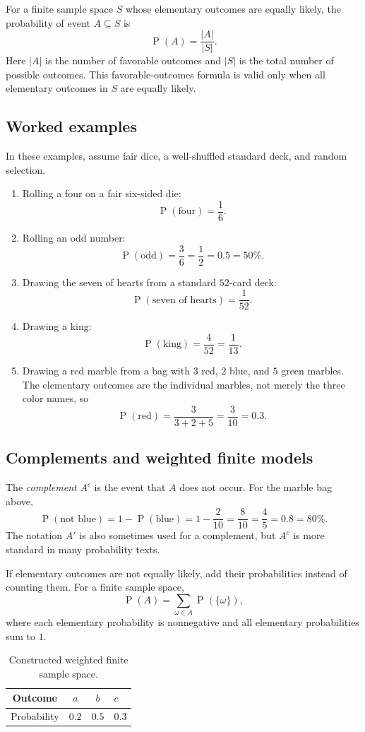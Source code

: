 \documentclass[11pt]{article}
\newcommand{\Pp}{\operatorname{P}}
\begin{document}
For a finite sample space $S$ whose elementary outcomes are equally likely, the
probability of event $A\subseteq S$ is
\[
\Pp(A)=\frac{|A|}{|S|}.
\]
Here $|A|$ is the number of favorable outcomes and $|S|$ is the total number of
possible outcomes.  This favorable-outcomes formula is valid only when all
elementary outcomes in $S$ are equally likely.

\subsection{Worked examples}
In these examples, assume fair dice, a well-shuffled standard deck, and random
selection.
\begin{enumerate}[label=\textbf{\arabic*.}]
\item Rolling a four on a fair six-sided die:
\[
\Pp(\text{four})=\frac{1}{6}.
\]
\item Rolling an odd number:
\[
\Pp(\text{odd})=\frac{3}{6}=\frac{1}{2}=0.5=50\%.
\]
\item Drawing the seven of hearts from a standard $52$-card deck:
\[
\Pp(\text{seven of hearts})=\frac{1}{52}.
\]
\item Drawing a king:
\[
\Pp(\text{king})=\frac{4}{52}=\frac{1}{13}.
\]
\item Drawing a red marble from a bag with $3$ red, $2$ blue, and $5$ green
marbles.  The elementary outcomes are the individual marbles, not merely the
three color names, so
\[
\Pp(\text{red})=\frac{3}{3+2+5}=\frac{3}{10}=0.3.
\]
\end{enumerate}

\subsection{Complements and weighted finite models}
The \emph{complement} $A^c$ is the event that $A$ does not occur.  For the
marble bag above,
\[
\Pp(\text{not blue})=1-\Pp(\text{blue})
=1-\frac{2}{10}=\frac{8}{10}=\frac{4}{5}=0.8=80\%.
\]
The notation $A'$ is also sometimes used for a complement, but $A^c$ is more
standard in many probability texts.

If elementary outcomes are not equally likely, add their probabilities instead
of counting them.  For a finite sample space,
\[
\Pp(A)=\sum_{\omega\in A}\Pp(\{\omega\}),
\]
where each elementary probability is nonnegative and all elementary probabilities
sum to $1$.

\begin{table}[ht]
\centering
\caption{Constructed weighted finite sample space.}\label{tab:weighted}
\begin{tabular}{@{}ccc@{}}
\toprule
Outcome & $a$ & $b$ & $c$ \\
\midrule
Probability & $0.2$ & $0.5$ & $0.3$ \\
\bottomrule
\end{tabular}
\end{table}
\end{document}
